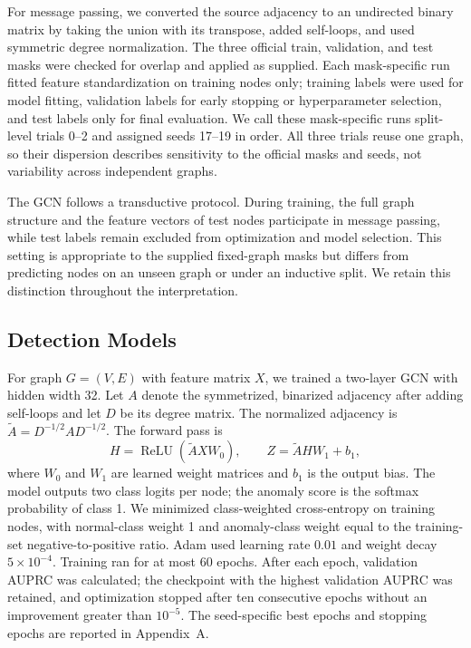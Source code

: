 \documentclass[11pt,a4paper]{article}
\begin{document}
For message passing, we converted the source adjacency to an undirected binary matrix by taking the union with its transpose, added self-loops, and used symmetric degree normalization. The three official train, validation, and test masks were checked for overlap and applied as supplied. Each mask-specific run fitted feature standardization on training nodes only; training labels were used for model fitting, validation labels for early stopping or hyperparameter selection, and test labels only for final evaluation. We call these mask-specific runs split-level trials 0--2 and assigned seeds 17--19 in order. All three trials reuse one graph, so their dispersion describes sensitivity to the official masks and seeds, not variability across independent graphs.

The GCN follows a transductive protocol. During training, the full graph structure and the feature vectors of test nodes participate in message passing, while test labels remain excluded from optimization and model selection. This setting is appropriate to the supplied fixed-graph masks but differs from predicting nodes on an unseen graph or under an inductive split. We retain this distinction throughout the interpretation.

\subsection{Detection Models}
For graph $G=(V,E)$ with feature matrix $X$, we trained a two-layer GCN with hidden width 32. Let $A$ denote the symmetrized, binarized adjacency after adding self-loops and let $D$ be its degree matrix. The normalized adjacency is $\tilde A=D^{-1/2}AD^{-1/2}$. The forward pass is
\begin{equation}
  H=\operatorname{ReLU}(\tilde A X W_0),\qquad Z=\tilde A H W_1+b_1,
\end{equation}
where $W_0$ and $W_1$ are learned weight matrices and $b_1$ is the output bias. The model outputs two class logits per node; the anomaly score is the softmax probability of class 1. We minimized class-weighted cross-entropy on training nodes, with normal-class weight 1 and anomaly-class weight equal to the training-set negative-to-positive ratio. Adam used learning rate $0.01$ and weight decay $5\times10^{-4}$. Training ran for at most 60 epochs. After each epoch, validation AUPRC was calculated; the checkpoint with the highest validation AUPRC was retained, and optimization stopped after ten consecutive epochs without an improvement greater than $10^{-5}$. The seed-specific best epochs and stopping epochs are reported in Appendix~A.
\end{document}
